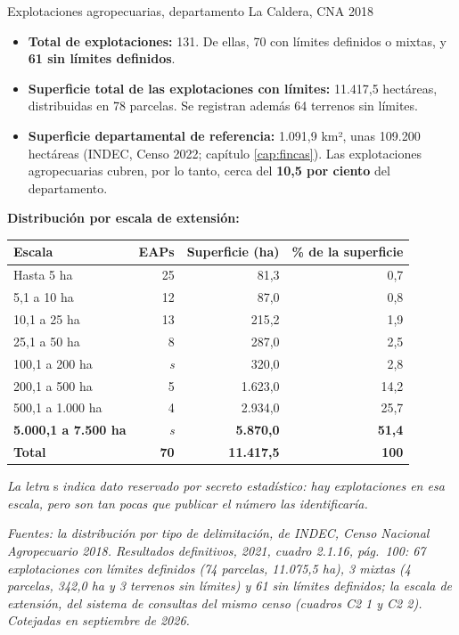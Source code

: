 \begin{ficha}{Explotaciones agropecuarias, departamento La Caldera, CNA 2018}
\begin{itemize}[leftmargin=*,nosep]
\item \textbf{Total de explotaciones:} 131. De ellas, 70 con límites definidos o mixtas, y \textbf{61 sin límites definidos}.
\item \textbf{Superficie total de las explotaciones con límites:} 11.417,5 hectáreas, distribuidas en 78 parcelas. Se registran además 64 terrenos sin límites.
\item \textbf{Superficie departamental de referencia:} 1.091,9 km², unas 109.200 hectáreas (INDEC, Censo 2022; capítulo \ref{cap:fincas}). Las explotaciones agropecuarias cubren, por lo tanto, cerca del \textbf{10,5 por ciento} del departamento.
\end{itemize}
\textbf{Distribución por escala de extensión:}
\begin{center}\small
\begin{tabular}{@{}lrrr@{}}
\toprule
Escala & EAPs & Superficie (ha) & \% de la superficie \\
\midrule
Hasta 5 ha & 25 & 81,3 & 0,7 \\
5,1 a 10 ha & 12 & 87,0 & 0,8 \\
10,1 a 25 ha & 13 & 215,2 & 1,9 \\
25,1 a 50 ha & 8 & 287,0 & 2,5 \\
100,1 a 200 ha & \textit{s} & 320,0 & 2,8 \\
200,1 a 500 ha & 5 & 1.623,0 & 14,2 \\
500,1 a 1.000 ha & 4 & 2.934,0 & 25,7 \\
\textbf{5.000,1 a 7.500 ha} & \textit{s} & \textbf{5.870,0} & \textbf{51,4} \\
\midrule
\textbf{Total} & \textbf{70} & \textbf{11.417,5} & \textbf{100} \\
\bottomrule
\end{tabular}
\end{center}
\textit{La letra} s \textit{indica dato reservado por secreto estadístico: hay explotaciones en esa escala, pero son tan pocas que publicar el número las identificaría.}

\textit{Fuentes: la distribución por tipo de delimitación, de INDEC, \textit{Censo Nacional Agropecuario 2018. Resultados definitivos}, 2021, cuadro 2.1.16, pág.\ 100: 67 explotaciones con límites definidos (74 parcelas, 11.075,5 ha), 3 mixtas (4 parcelas, 342,0 ha y 3 terrenos sin límites) y 61 sin límites definidos; la escala de extensión, del sistema de consultas del mismo censo (cuadros C2 1 y C2 2). Cotejadas en septiembre de 2026.}
\end{ficha}


